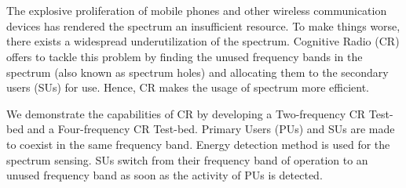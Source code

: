 \chapter*{}
The explosive proliferation of mobile phones and other wireless communication
devices has rendered the spectrum an insufficient resource. To make things
worse, there exists a widespread underutilization of the spectrum. Cognitive
Radio (CR) offers to tackle this problem by finding the unused frequency bands
in the spectrum (also known as spectrum holes) and allocating them to the
secondary users (SUs) for use. Hence, CR makes the usage of spectrum more
efficient.

We demonstrate the capabilities of CR by developing a Two-frequency CR Test-bed
and a Four-frequency CR Test-bed. Primary Users (PUs) and SUs are made to
coexist in the same frequency band. Energy detection method is used for the
spectrum sensing. SUs switch from their frequency band of operation to an
unused frequency band as soon as the activity of PUs is detected.